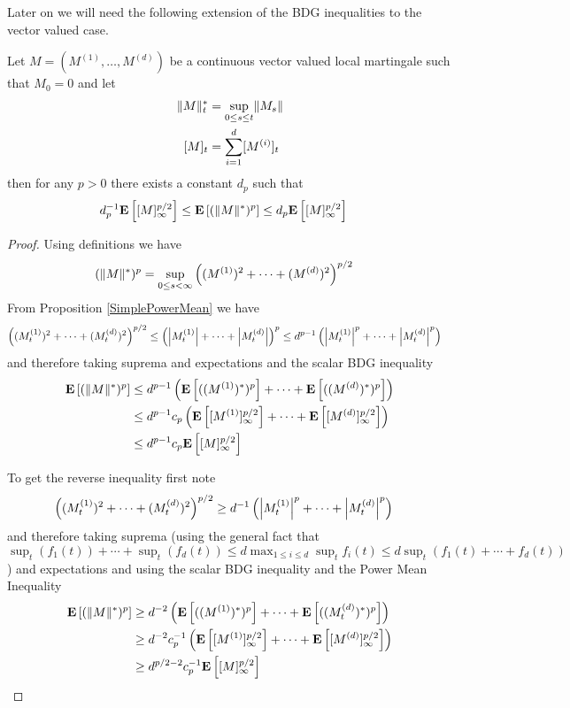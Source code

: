 Later on we will need the following extension of the BDG inequalities to the vector valued case.
\begin{cor}\label{BDGVectorInequalities}Let $M = (M^{(1)}, \dotsc, M^{(d)})$ be a continuous vector valued local martingale such that $M_0 = 0$ and let 
\begin{align*}
\lVert M \rVert^*_t &= \sup_{0 \leq s \leq t} \lVert M_s \rVert \\
[M]_t &= \sum_{i=1}^d [M^{(i)}]_t
\end{align*}
then for any $p > 0$ there exists a constant $d_p$ such that 
\begin{align*}
d_p^{-1} \textbf{E}\left[[M]^{p/2}_\infty\right] &\leq \textbf{E}\left[(\lVert M \rVert^*)^p\right] \leq d_p \textbf{E}\left[[M]^{p/2}_\infty\right]
\end{align*}
\end{cor}
\begin{proof}
Using definitions we have
\begin{align*}
(\lVert M \rVert^*)^p &= 
\sup_{0 \leq s < \infty} \left( (M^{(1)})^2 + \dotsm + (M^{(d)})^2 \right)^{p/2}
\end{align*}
From Proposition \ref{SimplePowerMean} we have 
\begin{align*}
\left( (M_t^{(1)})^2 + \dotsm + (M_t^{(d)})^2 \right)^{p/2} &\leq
\left( \left \vert M_t^{(1)} \right \vert + \dotsm + \left \vert M_t^{(d)} \right \vert \right)^{p} \leq d^{p-1} \left( \left \vert M_t^{(1)} \right \vert^p + \dotsm + \left \vert M_t^{(d)} \right \vert^p \right)
\end{align*}
and therefore taking suprema and expectations and the scalar BDG inequality
\begin{align*}
\textbf{E}\left[(\lVert M \rVert^*)^p\right] &\leq d^{p-1} \left( \textbf{E}\left[((M^{(1)})^*)^p\right] + \dotsm + \textbf{E}\left[((M^{(d)})^*)^p\right] \right) \\
&\leq d^{p-1} c_p \left( \textbf{E}\left[[M^{(1)}]^{p/2}_\infty\right] + \dotsm + \textbf{E}\left[[M^{(d)}]^{p/2}_\infty\right] \right) \\
&\leq d^{p-1} c_p \textbf{E}\left[[M]^{p/2}_\infty\right]
\end{align*}

To get the reverse inequality first note
\begin{align*}
\left( (M_t^{(1)})^2 + \dotsm + (M_t^{(d)})^2 \right)^{p/2} &\geq
d^{-1} \left( \left \vert M_t^{(1)} \right \vert^p + \dotsm + \left \vert M_t^{(d)} \right \vert^p \right) 
\end{align*}
and therefore taking suprema (using the general fact that $\sup_t (f_1(t)) + \dotsm + \sup_t (f_d(t)) \leq  d \max_{1\leq i \leq d} \sup_t f_i(t) \leq d \sup_t (f_1(t) + \dotsm + f_d(t))$)
and expectations and using the scalar BDG inequality and the Power Mean Inequality
\begin{align*}
\textbf{E}\left[(\lVert M \rVert^*)^p\right] &\geq
d^{-2} \left( \textbf{E}\left[((M^{(1)})^*)^p\right] + \dotsm + \textbf{E}\left[((M_t^{(d)})^*)^p \right] \right)  \\
&\geq d^{-2} c_p^{-1} \left( \textbf{E}\left[[M^{(1)}]^{p/2}_\infty\right] + \dotsm + \textbf{E}\left[[M^{(d)}]^{p/2}_\infty\right] \right) \\
&\geq d^{p/2-2} c_p^{-1} \textbf{E}\left[[M]^{p/2}_\infty\right]
\end{align*}
\end{proof}


